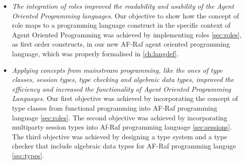 \documentclass[a4paper,12pt,oneside,fleqn]{book} %
\begin{document}
\begin{itemize}
\item \textit{The integration of roles improved the readability and
usability of the Agent Oriented Programming languages}. Our objective to
show how the concept of role maps to a programming language construct in
the specific context of Agent Oriented Programming was achieved by
implementing roles \autoref{sec:roles}, as first order constructs, in our new AF-Raf
agent oriented programming language, which was properly formalised in
\autoref{ch:langdef}.

\item \textit{Applying concepts from mainstream programming, like the ones
  of type classes, session types, type checking and algebraic data types,
improved the efficiency and increased the functionality of Agent Oriented
Programming Languages}. Our first objective was achieved by incorporating
the concept of type classes from functional programming into AF-Raf
programming language \autoref{sec:roles}. The second objective was achieved
by incorporating multiparty session types into Af-Raf programming language
\autoref{sec:sessions}. The third objective was achieved by designing a
type system and a type checker that include algebraic data types for AF-Raf
programming languge \autoref{sec:types}.

\end{itemize}
\newpage
\appendix
\end{document}
